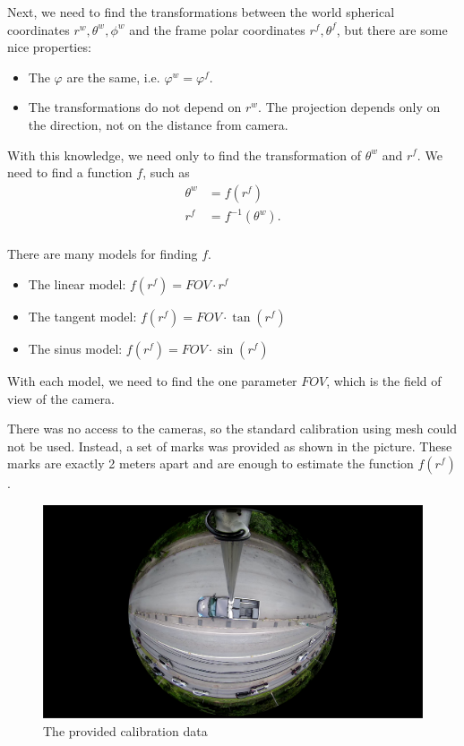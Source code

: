 \documentclass[a4paper,12pt,titlepage]{article}
\numberwithin{figure}{section}
\begin{document}
Next, we need to find the transformations between the world spherical coordinates $r^w, \theta^w, \phi^w$ and the frame polar coordinates $r^f, \theta^f$, but there are some nice properties:

\begin{itemize}
\item The $\varphi$ are the same, i.e. $\varphi^w = \varphi^f$.
\item The transformations do not depend on $r^w$. The projection depends only on the direction, not on the distance from camera.
\end{itemize}

With this knowledge, we need only to find the transformation of $\theta^w$ and $r^f$. We need to find a function $f$, such as 
\begin{equation}
\begin{aligned}
\theta^w &= f(r^f) \\
r^f &= f^{-1}(\theta^w). \\
\end{aligned}
\end{equation}

There are many models for finding $f$. 

\begin{itemize}
\item The linear model: $f(r^f) = FOV \cdot r^f$
\item The tangent model: $f(r^f) = FOV \cdot \tan(r^f)$
\item The sinus model: $f(r^f) = FOV \cdot \sin(r^f)$
\end{itemize}

With each model, we need to find the one parameter $FOV$, which is the field of view of the camera.

There was no access to the cameras, so the standard calibration using mesh could not be used. Instead, a set of marks was provided as shown in the picture. These marks are exactly 2 meters apart and are enough to estimate the function $f(r^f)$.

\begin{figure}[h!]
\centering
\includegraphics[width=1\linewidth]{fig/calibration.png}
\caption{The provided calibration data}
\label{fig:calibration}
\end{figure}
\end{document}
